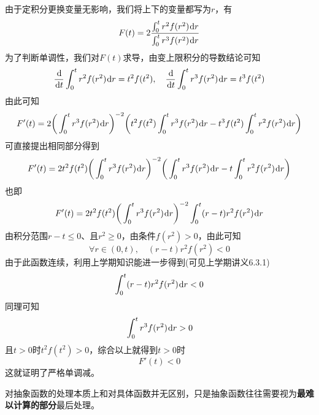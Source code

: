 \documentclass[a4paper,UTF8,fontset=windows,AutoFakeBold]{ctexart}
\newcommand*{\dr}{\hspace{0.07em}\mathrm{d}}
\newcommand*{\note}{\noindent *}
\theoremstyle{ex}
\begin{document}
\begin{framed}
{\begin{itemize}
        由于定积分更换变量无影响，我们将上下的变量都写为$r$，有
        $$F(t)=2\frac{\int_0^tr^2f(r^2)\dr r}{\int_0^tr^3f(r^2)\dr r}$$
        为了判断单调性，我们对$F(t)$求导，由变上限积分的导数结论可知
        $$\frac{\dr}{\dr t}\int_0^tr^2f(r^2)\dr r=t^2f(t^2),\quad\frac{\dr}{\dr t}\int_0^tr^3f(r^2)\dr r=t^3f(t^2)$$
        由此可知
        $$F'(t)=2\bigg(\int_0^tr^3f(r^2)\dr r\bigg)^{-2}\bigg(t^2f(t^2)\int_0^tr^3f(r^2)\dr r-t^3f(t^2)\int_0^tr^2f(r^2)\dr r\bigg)$$
        可直接提出相同部分得到
        $$F'(t)=2t^2f(t^2)\bigg(\int_0^tr^3f(r^2)\dr r\bigg)^{-2}\bigg(\int_0^tr^3f(r^2)\dr r-t\int_0^tr^2f(r^2)\dr r\bigg)$$
        也即
        $$F'(t)=2t^2f(t^2)\bigg(\int_0^tr^3f(r^2)\dr r\bigg)^{-2}\int_0^t(r-t)r^2f(r^2)\dr r$$
        由积分范围$r-t\le0$、且$r^2\ge0$，由条件$f(r^2)>0$，由此可知
        $$\forall r\in(0,t),\quad(r-t)r^2f(r^2)<0$$
        由于此函数连续，利用上学期知识能进一步得到(可见上学期讲义6.3.1)
        $$\int_0^t(r-t)r^2f(r^2)\dr r<0$$
        同理可知
        $$\int_0^tr^3f(r^2)\dr r>0$$
        且$t>0$时$t^2f(t^2)>0$，综合以上就得到$t>0$时
        $$F'(t)<0$$
        这就证明了严格单调减。
    \end{itemize}
}
\end{framed}

\note 对抽象函数的处理本质上和对具体函数并无区别，只是抽象函数往往需要视为\textbf{最难以计算的部分}最后处理。
\end{document}
